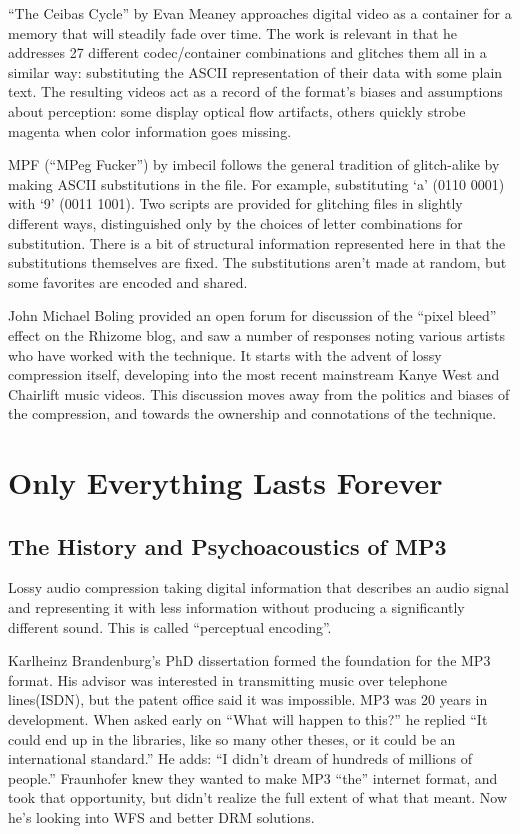 \documentclass{thesis}
\begin{document}
	\cite{evan_meaney_ceibas:_2008}
	``The Ceibas Cycle'' by Evan Meaney approaches digital video as a container for a memory that will steadily fade over time. The work is relevant in that he addresses 27 different codec/container combinations and glitches them all in a similar way: substituting the ASCII representation of their data with some plain text. The resulting videos act as a record of the format's biases and assumptions about perception: some display optical flow artifacts, others quickly strobe magenta when color information goes missing.
	
	\cite{imbecil_mpeg_2004}
	MPF (``MPeg Fucker'') by imbecil follows the general tradition of glitch-alike by making ASCII substitutions in the file. For example, substituting `a' (0110 0001) with `9' (0011 1001). Two scripts are provided for glitching files in slightly different ways, distinguished only by the choices of letter combinations for substitution. There is a bit of structural information represented here in that the substitutions themselves are fixed. The substitutions aren't made at random, but some favorites are encoded and shared.
	
	\cite{john_michael_boling_rhizome_????}
	John Michael Boling provided an open forum for discussion of the ``pixel bleed'' effect on the Rhizome blog, and saw a number of responses noting various artists who have worked with the technique. It starts with the advent of lossy compression itself, developing into the most recent mainstream Kanye West and Chairlift music videos. This discussion moves away from the politics and biases of the compression, and towards the ownership and connotations of the technique.
	
	\cite{nikolai_trunichkin_and_dr._dmitriy_vatolin_crazy_????}
	\cite{ramachandran_phantoms_1999}
	
\chapter{Only Everything Lasts Forever}
\section{The History and Psychoacoustics of MP3}
Lossy audio compression taking digital information that describes an audio signal and representing it with less information without producing a significantly different sound. This is called ``perceptual encoding''.\cite{Ruckert05}

Karlheinz Brandenburg's PhD dissertation formed the foundation for the MP3 format. His advisor was interested in transmitting music over telephone lines(ISDN), but the patent office said it was impossible. MP3 was 20 years in development. When asked early on ``What will happen to this?'' he replied ``It could end up in the libraries, like so many other theses, or it could be an international standard.'' He adds: ``I didn't dream of hundreds of millions of people.'' Fraunhofer knew they wanted to make MP3 ``the'' internet format, and took that opportunity, but didn't realize the full extent of what that meant. Now he's looking into WFS and better DRM solutions.\cite{brandenburg_interviews_2004}
	
\end{document}
